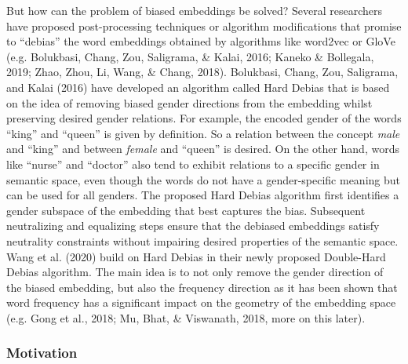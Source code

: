 \documentclass[
  english,
  man,floatsintext]{apa6}
\begin{document}
But how can the problem of biased embeddings be solved? Several researchers have proposed post-processing techniques or algorithm modifications that promise to ``debias'' the word embeddings obtained by algorithms like word2vec or GloVe (e.g. Bolukbasi, Chang, Zou, Saligrama, \& Kalai, 2016; Kaneko \& Bollegala, 2019; Zhao, Zhou, Li, Wang, \& Chang, 2018).
Bolukbasi, Chang, Zou, Saligrama, and Kalai (2016) have developed an algorithm called Hard Debias that is based on the idea of removing biased gender directions from the embedding whilst preserving desired gender relations. For example, the encoded gender of the words ``king'' and ``queen'' is given by definition. So a relation between the concept \emph{male} and ``king'' and between \emph{female} and ``queen'' is desired. On the other hand, words like ``nurse'' and ``doctor'' also tend to exhibit relations to a specific gender in semantic space, even though the words do not have a gender-specific meaning but can be used for all genders. The proposed Hard Debias algorithm first identifies a gender subspace of the embedding that best captures the bias. Subsequent neutralizing and equalizing steps ensure that the debiased embeddings satisfy neutrality constraints without impairing desired properties of the semantic space.
Wang et al. (2020) build on Hard Debias in their newly proposed Double-Hard Debias algorithm. The main idea is to not only remove the gender direction of the biased embedding, but also the frequency direction as it has been shown that word frequency has a significant impact on the geometry of the embedding space (e.g. Gong et al., 2018; Mu, Bhat, \& Viswanath, 2018, more on this later).

\hypertarget{motivation}{%
\subsubsection{Motivation}\label{motivation}}
\end{document}
